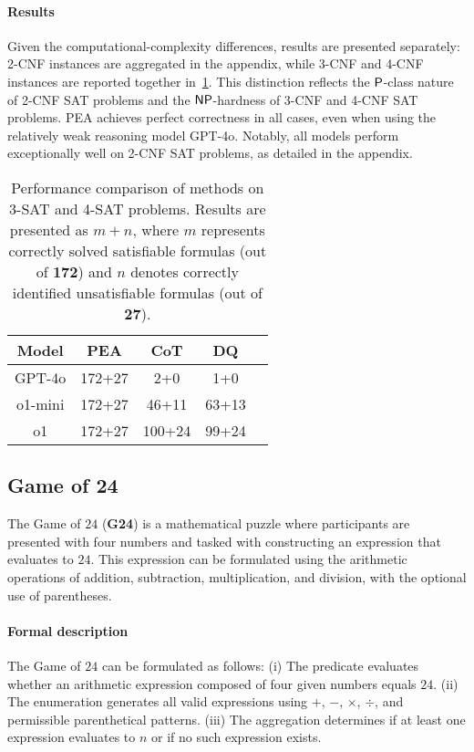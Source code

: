 \paragraph{Results}Given the computational-complexity differences, results are presented separately: 2-CNF instances are aggregated in the appendix, while 3-CNF and 4-CNF instances are reported together in~\cref{tab:34-cnf}. This distinction reflects the $\mathsf{P}$-class nature of 2-CNF SAT problems and the $\mathsf{NP}$-hardness of 3-CNF and 4-CNF SAT problems. PEA achieves perfect correctness in all cases, even when using the relatively weak reasoning model GPT-4o. Notably, all models perform exceptionally well on 2-CNF SAT problems, as detailed in the appendix.



\begin{table}
\begin{center}
\caption{Performance comparison of methods on 3-SAT and 4-SAT problems. Results are presented as $m+n$, where $m$ represents correctly solved satisfiable formulas (out of \textbf{172}) and $n$ denotes correctly identified unsatisfiable formulas (out of \textbf{27}).
}
\begin{tabular}{ ccccc } 
\toprule
\bf Model & \bf PEA & \bf CoT & \bf DQ  \\  
\hline
GPT-4o & 172+27  & 2+0 & 1+0  \\  
\hline
o1-mini &  172+27 &  46+11  &  63+13 \\  
\hline
o1 &  172+27 &  100+24 &  99+24  \\ 
  \bottomrule
\end{tabular}
\label{tab:34-cnf}
\end{center}
\vspace{-0.3cm}
\end{table}


\subsection{Game of 24}\label{sec:gon}
The Game of $24$ (\textbf{G24}) is a mathematical puzzle where participants are presented with four numbers and tasked with constructing an expression that evaluates to $24$. This expression can be formulated using the arithmetic operations of addition, subtraction, multiplication, and division, with the optional use of parentheses.

\paragraph{Formal description}The Game of $24$ can be formulated as follows: (i) The predicate evaluates whether an arithmetic expression composed of four given numbers equals $24$. (ii) The enumeration generates all valid expressions using $+$, $-$, $\times$, $\div$, and permissible parenthetical patterns. (iii) The aggregation determines if at least one expression evaluates to $n$ or if no such expression exists.


